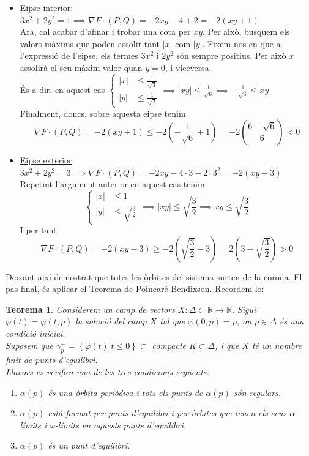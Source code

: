 \documentclass[10pt,a4paper]{article}
\newtheorem{thm}{Teorema}
\begin{document}
\begin{itemize}
  \item  \underline{E\lgem ipse interior}: $3x^2+2y^2=1\implies\nabla F\cdot(P,Q)=-2xy-4+2=-2(xy+1)$
        \\Ara, cal acabar d'afinar i trobar una cota per $xy$. Per això, busquem els valors màxims que poden assolir tant $|x|$ com $|y|$. Fixem-nos en que a l'expressió de l'e\lgem ipse, els termes $3x^2$ i $2y^2$ són sempre positius. Per això $x$ assolirà el seu màxim valor quan $y=0$, i viceversa. \\És a dir, en aquest cas $\displaystyle\left\lbrace
          \begin{aligned}
            |x| & \leq\frac{1}{\sqrt{3}} \\
            |y| & \leq\frac{1}{\sqrt{2}}
          \end{aligned}\right. \implies |xy|\leq\frac{1}{\sqrt{6}}\implies-\frac{1}{\sqrt{6}}\leq xy$
        \\Finalment, doncs, sobre aquesta e\lgem ipse tenim $$\nabla F\cdot(P,Q)=-2(xy+1)\leq-2\left(-\frac{1}{\sqrt{6}}+1\right)=-2\left(\frac{6-\sqrt{6}}{6} \right)<0 $$
  \item \underline{E\lgem ipse exterior}: $3x^2+2y^2=3\implies\nabla F\cdot(P,Q)=-2xy-4\cdot3+2\cdot3^2=-2(xy-3)$
        \\Repetint l'argument anterior en aquest cas tenim
        $$\displaystyle\left\lbrace
          \begin{aligned}
            |x| & \leq1                  \\
            |y| & \leq\sqrt{\frac{3}{2}}
          \end{aligned}\right. \implies |xy|\leq\sqrt{\frac{3}{2}}\implies xy\leq\sqrt{\frac{3}{2}}$$
        I per tant
        $$\nabla F\cdot(P,Q)=-2(xy-3)\geq-2\left(\sqrt{\frac{3}{2}}-3\right)=2\left(3-\sqrt{\frac{3}{2}}\right)>0 $$
\end{itemize}
Deixant així demostrat que totes les òrbites del sistema surten de la corona. El pas final, és aplicar el Teorema de Poincaré-Bendixson. Recordem-lo:
\begin{thm}
  Considerem un camp de vectors $X:\Delta\subset\mathbb{R}\longrightarrow\mathbb{R}$. Sigui $\varphi(t)=\varphi(t,p)$ la solució del camp $X$ tal que $\varphi(0,p)=p$, on $p\in\Delta$ és una condició inicial.
  \\Suposem que $\gamma_p^{-}=\left\lbrace \varphi(t)|t\leq0\right\rbrace \subset$ compacte $K\subset\Delta$, i que $X$ té un nombre finit de punts d'equilibri.
  \\Llavors es verifica una de les tres condicions següents:
  \begin{enumerate}[label=\roman*)]
    \item $\alpha(p)$ és una òrbita periòdica i tots els punts de $\alpha(p)$ són regulars.
    \item $\alpha(p)$ està format per punts d'equilibri i per òrbites que tenen els seus $\alpha$-límits i $\omega$-límits en aquests punts d'equilibri.
    \item $\alpha(p)$ és un punt d'equilibri.
  \end{enumerate}
\end{thm}
\end{document}
